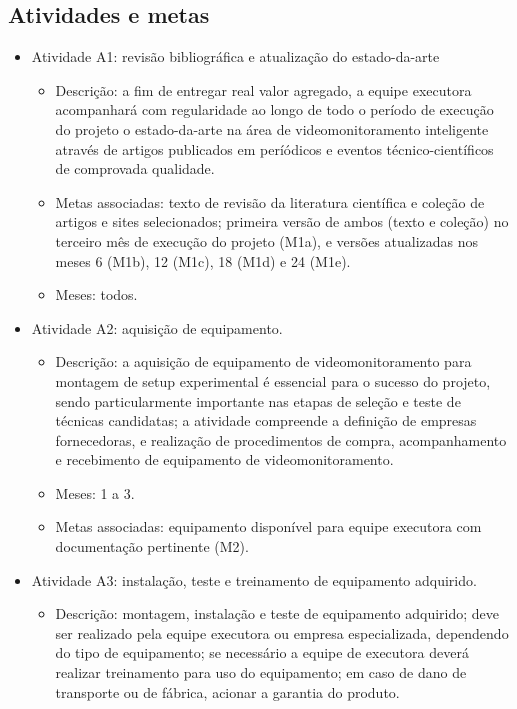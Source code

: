\subsection{Atividades e metas}
\begin{itemize}
	\item Atividade A1: revisão bibliográfica e atualização do estado-da-arte
	\begin{itemize}
		\item Descrição: a fim de entregar real valor agregado, a equipe executora acompanhará com regularidade ao longo de todo o período de execução do projeto o estado-da-arte na área de videomonitoramento inteligente através de artigos publicados em períódicos e eventos técnico-científicos de comprovada qualidade.
		\item Metas associadas: texto de revisão da literatura científica e coleção de artigos e sites selecionados; primeira versão de ambos (texto e coleção) no terceiro mês de execução do projeto (M1a), e versões atualizadas nos meses 6 (M1b), 12 (M1c), 18 (M1d) e 24 (M1e).
		\item Meses: todos.
	\end{itemize}
	\item Atividade A2: aquisição de equipamento.
	\begin{itemize}
		\item Descrição: a aquisição de equipamento de videomonitoramento para montagem de setup experimental é essencial para o sucesso do projeto, sendo particularmente importante nas etapas de seleção e teste de técnicas candidatas; a atividade compreende a definição de empresas fornecedoras, e realização de procedimentos de compra, acompanhamento e recebimento de equipamento de videomonitoramento. 
		\item Meses: 1 a 3.
		\item Metas associadas: equipamento disponível para equipe executora com documentação pertinente (M2).
	\end{itemize}
	\item Atividade A3: instalação, teste e treinamento de equipamento adquirido.
	\begin{itemize}
		\item Descrição: montagem, instalação e teste de equipamento adquirido; deve ser realizado pela equipe executora ou empresa especializada, dependendo do tipo de equipamento; se necessário a equipe de executora deverá realizar treinamento para uso do equipamento; em caso de dano de transporte ou de fábrica, acionar a garantia do produto.

\end{itemize}
\end{itemize}
